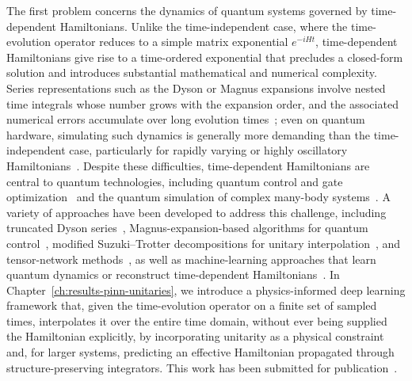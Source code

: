 The first problem concerns the dynamics of quantum systems governed by time-dependent Hamiltonians. Unlike the time-independent case, where the time-evolution operator reduces to a simple matrix exponential $e^{-iHt}$, time-dependent Hamiltonians give rise to a time-ordered exponential that precludes a closed-form solution and introduces substantial mathematical and numerical complexity. Series representations such as the Dyson or Magnus expansions involve nested time integrals whose number grows with the expansion order, and the associated numerical errors accumulate over long evolution times~\cite{blanes2009, wiebe_simulating_2011}; even on quantum hardware, simulating such dynamics is generally more demanding than the time-independent case, particularly for rapidly varying or highly oscillatory Hamiltonians~\cite{an2022}. Despite these difficulties, time-dependent Hamiltonians are central to quantum technologies, including quantum control and gate optimization~\cite{Ansel_2024} and the quantum simulation of complex many-body systems~\cite{georgescu2014, cao2025}. A variety of approaches have been developed to address this challenge, including truncated Dyson series~\cite{berry_2015, krieferova_2019}, Magnus-expansion-based algorithms for quantum control~\cite{Dalgaard_2022, chen_quantum_2023, fang_time-dependent_2024}, modified Suzuki--Trotter decompositions for unitary interpolation~\cite{schilling2024}, and tensor-network methods~\cite{vidal_efficient_2004, tepaske2023, causer2024}, as well as machine-learning approaches that learn quantum dynamics or reconstruct time-dependent Hamiltonians~\cite{che_2021, han_2021, franceschetto2025}. In Chapter~\ref{ch:results-pinn-unitaries}, we introduce a physics-informed deep learning framework that, given the time-evolution operator on a finite set of sampled times, interpolates it over the entire time domain, without ever being supplied the Hamiltonian explicitly, by incorporating unitarity as a physical constraint and, for larger systems, predicting an effective Hamiltonian propagated through structure-preserving integrators. This work has been submitted for publication~\cite{guerra2026interpolation}.

